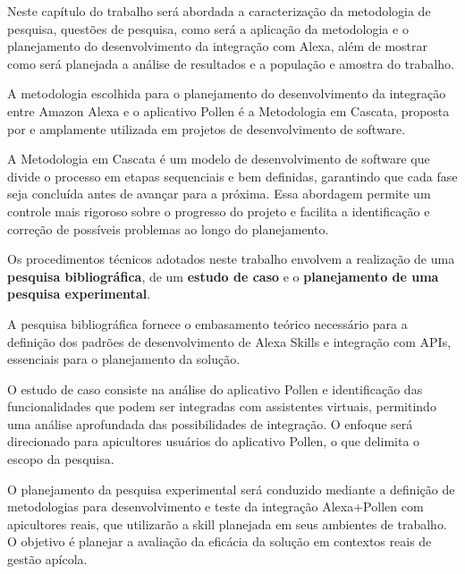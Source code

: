 \label{cap:procedimentos-metodologicos-tecnicos}

Neste capítulo do trabalho será abordada a caracterização da metodologia de pesquisa, questões de pesquisa,
como será a aplicação da metodologia e o planejamento do desenvolvimento da integração com Alexa, além de mostrar como será planejada a análise de resultados e a população e amostra do trabalho.

\label{sec:caracterizacao-metodologia-pesquisa}
    
A metodologia escolhida para o planejamento do desenvolvimento da integração entre Amazon Alexa e o aplicativo Pollen é a Metodologia em Cascata, 
proposta por \textcite{sommerville2011} e amplamente utilizada em projetos de desenvolvimento de software.

A Metodologia em Cascata é um modelo de desenvolvimento de software que divide o processo em etapas sequenciais e bem definidas, 
garantindo que cada fase seja concluída antes de avançar para a próxima. Essa abordagem permite um controle mais rigoroso sobre o progresso do projeto e facilita a identificação e correção de possíveis problemas ao longo do planejamento.

Os procedimentos técnicos adotados neste trabalho envolvem a realização de uma \textbf{pesquisa bibliográfica}, de um \textbf{estudo de caso} e o \textbf{planejamento de uma pesquisa experimental}.

A pesquisa bibliográfica fornece o embasamento teórico necessário para a definição dos padrões de desenvolvimento de Alexa Skills e integração com APIs, essenciais para o planejamento da solução.

O estudo de caso consiste na análise do aplicativo Pollen e identificação das funcionalidades que podem ser integradas com assistentes virtuais, permitindo uma análise aprofundada das possibilidades de integração. O enfoque será direcionado para apicultores usuários do aplicativo Pollen, o que delimita o escopo da pesquisa.

O planejamento da pesquisa experimental será conduzido mediante a definição de metodologias para desenvolvimento e teste da integração Alexa+Pollen com apicultores reais, que utilizarão a skill planejada em seus ambientes de trabalho. O objetivo é planejar a avaliação da eficácia da solução em contextos reais de gestão apícola.
    
    
\label{sec:questoes-pesquisa}

